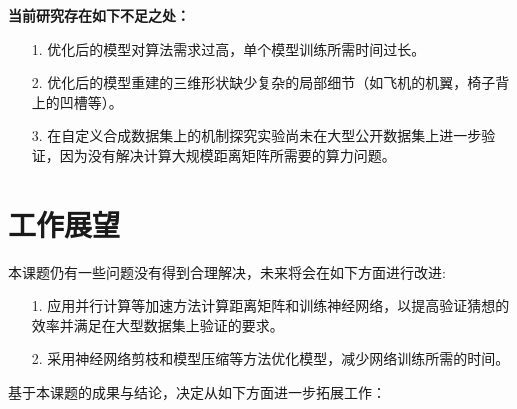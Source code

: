 \documentclass[bachelor, nocolorlinks, printoneside]{seuthesis} %
\begin{document}
\begin{Main}
\noindent
\textbf{当前研究存在如下不足之处：}
\begin{itemize}
    \item[1.] 优化后的模型对算法需求过高，单个模型训练所需时间过长。
    \item[2.] 优化后的模型重建的三维形状缺少复杂的局部细节（如飞机的机翼，椅子背上的凹槽等）。
    \item[3.] 在自定义合成数据集上的机制探究实验尚未在大型公开数据集上进一步验证，因为没有解决计算大规模距离矩阵所需要的算力问题。
\end{itemize}

\section{工作展望}
本课题仍有一些问题没有得到合理解决，未来将会在如下方面进行改进:

\begin{itemize}
    \item[1.] 应用并行计算等加速方法计算距离矩阵和训练神经网络，以提高验证猜想的效率并满足在大型数据集上验证的要求。
    \item[2.] 采用神经网络剪枝和模型压缩等方法优化模型，减少网络训练所需的时间。
\end{itemize}

基于本课题的成果与结论，决定从如下方面进一步拓展工作：


\end{Main}
\end{document}
